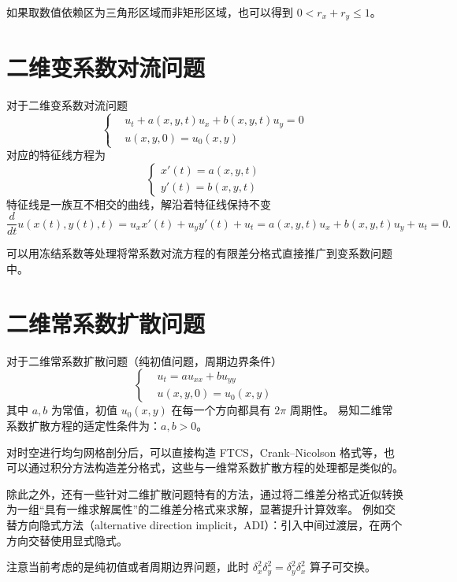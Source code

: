 \begin{remark}
    如果取数值依赖区为三角形区域而非矩形区域，也可以得到 $0 < r_x + r_y \le 1$。
\end{remark}

\section{二维变系数对流问题}


对于二维变系数对流问题
\[
    \left\{
    \begin{aligned}
         & u_t + a(x,y,t) u_x + b(x,y,t) u_y = 0 \\
         & u(x,y,0) = u_0(x,y)
    \end{aligned}
    \right.
\]
对应的特征线方程为
\[
    \left\{
    \begin{aligned}
        x'(t) = a(x,y,t) \\
        y'(t) = b(x,y,t)
    \end{aligned}
    \right.
\]
特征线是一族互不相交的曲线，解沿着特征线保持不变
\[
    \frac{d}{dt}u(x(t),y(t),t) = u_x x'(t) + u_y y'(t) + u_t = a(x,y,t) u_x + b(x,y,t) u_y + u_t = 0.
\]

可以用冻结系数等处理将常系数对流方程的有限差分格式直接推广到变系数问题中。


\section{二维常系数扩散问题}

对于二维常系数扩散问题（纯初值问题，周期边界条件）
\[
    \left\{
    \begin{aligned}
         & u_t = a u_{xx} + b u_{yy} \\
         & u(x,y,0) = u_0(x,y)
    \end{aligned}
    \right.
\]
其中 $a,b$ 为常值，初值 $u_0(x,y)$ 在每一个方向都具有 $2\pi$ 周期性。
易知二维常系数扩散方程的适定性条件为：$a,b > 0$。

对时空进行均匀网格剖分后，可以直接构造 FTCS，Crank–Nicolson 格式等，也可以通过积分方法构造差分格式，这些与一维常系数扩散方程的处理都是类似的。

除此之外，还有一些针对二维扩散问题特有的方法，通过将二维差分格式近似转换为一组“具有一维求解属性”的二维差分格式来求解，显著提升计算效率。
例如交替方向隐式方法（alternative direction implicit，ADI）：引入中间过渡层，在两个方向交替使用显式隐式。

\begin{remark}
    注意当前考虑的是纯初值或者周期边界问题，此时 $\delta_x^2 \delta_y^2 = \delta_y^2 \delta_x^2$ 算子可交换。
\end{remark}


